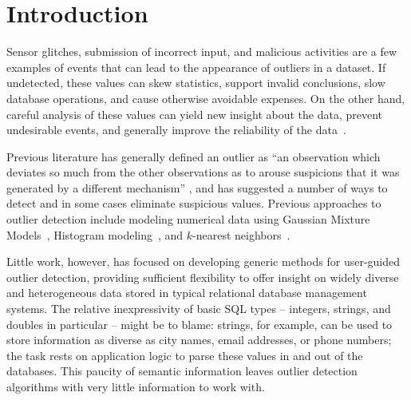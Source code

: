 \section{Introduction}
\label{sec:intro}

Sensor glitches, submission of incorrect input, and malicious activities are a few examples of events that can lead to the appearance of outliers in a dataset. If undetected, these values can skew statistics, support invalid conclusions, slow database operations, and cause otherwise avoidable expenses. On the other hand, careful analysis of these values can yield new insight about the data, prevent undesirable events, and generally improve the reliability of the data~\cite{Achour2014}.

Previous literature has generally defined an outlier as ``an observation which deviates so much from the other observations as to arouse suspicions that it was generated by a different mechanism'' \cite{Hawkins1980}, and has suggested a number of ways to detect and in some cases eliminate suspicious values. Previous approaches to outlier detection include modeling numerical data using Gaussian Mixture Models~\cite{Lu2005,Roberts1994,Roberts1999}, Histogram modeling~\cite{Gebski2007,Sheng2007}, and $k$-nearest neighbors~\cite{Ramaswamy2000}.

Little work, however, has focused on developing generic methods for user-guided outlier detection, providing sufficient flexibility to offer insight on widely diverse and heterogeneous data stored in typical relational database management systems. The relative inexpressivity of basic SQL types -- integers, strings, and doubles in particular -- might be to blame: strings, for example, can be used to store information as diverse as city names, email addresses, or phone numbers; the task rests on application logic to parse these values in and out of the databases. This paucity of semantic information leaves outlier detection algorithms with very little information to work with.

